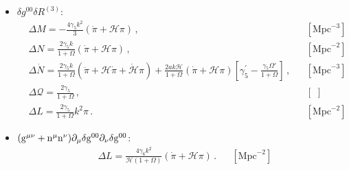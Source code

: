 \documentclass[prd,nofootinbib,showpacs]{revtex4}
\def\l{\left}
\def\r{\right}
\def\f{\frac}
\def\hub{{\mathcal H}}
\begin{document}
{\begin{itemize}
{\begin{align}
%
\Delta{ Y} =& \f{1}{2(1+\Omega)}\l(\gamma_4+a\f{\gamma_4^\prime}{2} \r) \, ,& &  [\,\,]  \ \nonumber \\
%
\Delta{ M} =& -\gamma_4\l(\dot{\hub}-\hub^2-\f{k^2}{3}\r)\dot{\pi} -2\hub\l(\gamma_4+a\f{\gamma_4^\prime}{2} \r)\l(\dot{\hub}-\hub^2-\f{k^2}{3} \r)\pi -\gamma_4\l(\ddot{\hub}-2\hub\dot{\hub}\r)\pi  \, ,& &  [\text{Mpc}^{-3}] \,\nonumber\\
%
\Delta{ U} =& \f{\gamma_4}{2(1+\Omega)} \, . & &  [\,\,]  \,
\end{align}}
%
\item[] \underline{$\delta g^{00}\delta R^{(3)}$}:\\
{\small
\begin{align}\label{Eq:ContribGamma5}
%
&\Delta{ M}=-\f{4\gamma_5k^2}{3}\l(\dot{\pi}+\hub\pi \r) \, , & &  [\text{Mpc}^{-3}] \, \nonumber\\
%
&\Delta{ N}=\f{2\gamma_5k}{1+\Omega}\left(\dot{\pi}+\hub\pi\right) \, , & &  [\text{Mpc}^{-2}] \, \nonumber\\
%
&\Delta\dot{N} = \f{2\gamma_5k}{1+\Omega}\l(\ddot{\pi}+\hub\dot{\pi}+\dot{\hub}\pi\r)+\f{2ak\hub}{1+\Omega}\l(\dot{\pi}+\hub\pi\r)\l[ \gamma_5^\prime-\f{\gamma_5\Omega'}{1+\Omega}\r]  \, ,& &  [\text{Mpc}^{-3}] \,\nonumber\\
&\Delta\mathcal{Q}= \f{2\gamma_5}{1+\Omega}\,, & & [\,\, ] \nonumber \\
&\Delta L= \f{2\gamma_5}{1+\Omega}k^2 \pi\,.& &  [\text{Mpc}^{-2}]
\end{align}}
%
\item[] \underline{ $\rm(g^{\mu\nu}+n^\mu n^\nu)\partial_\mu\delta g^{00}\partial_\nu \delta g^{00}$}:\\
{\small
\begin{align}\label{Eq:ContribGamma6}
%
&\Delta{ L}= \f{4\gamma_6k^2}{\hub(1+\Omega)}\l(\dot{\pi}+\hub\pi\r) \, . & &  [\text{Mpc}^{-2}] \,
\end{align}}
\end{itemize}
%
}
\end{document}
